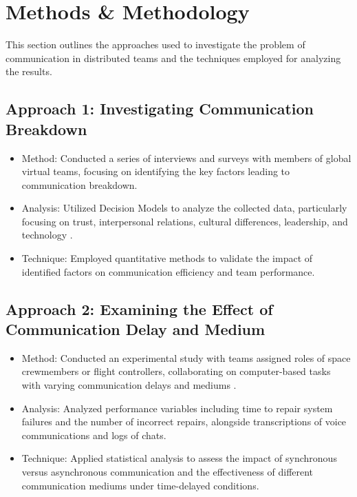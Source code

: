 \documentclass[12pt]{article}
\begin{document}
\section{Methods \& Methodology}

This section outlines the approaches used to investigate the problem of communication in distributed teams and the techniques employed for analyzing the results.

\subsection{Approach 1: Investigating Communication Breakdown}
\begin{itemize}
  \item Method: Conducted a series of interviews and surveys with members of global virtual teams, focusing on identifying the key factors leading to communication breakdown.
  \item Analysis: Utilized Decision Models to analyze the collected data, particularly focusing on trust, interpersonal relations, cultural differences, leadership, and technology \cite{ref1}.
  \item Technique: Employed quantitative methods to validate the impact of identified factors on communication efficiency and team performance.
\end{itemize}

\subsection{Approach 2: Examining the Effect of Communication Delay and Medium}
\begin{itemize}
  \item Method: Conducted an experimental study with teams assigned roles of space crewmembers or flight controllers, collaborating on computer-based tasks with varying communication delays and mediums \cite{ref2}.
  \item Analysis: Analyzed performance variables including time to repair system failures and the number of incorrect repairs, alongside transcriptions of voice communications and logs of chats.
  \item Technique: Applied statistical analysis to assess the impact of synchronous versus asynchronous communication and the effectiveness of different communication mediums under time-delayed conditions.
\end{itemize}
\end{document}
